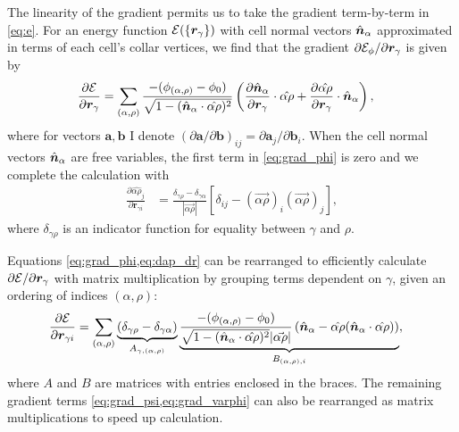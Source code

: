 The linearity of the gradient permits us to take the gradient term-by-term in \cref{eq:e}. For an energy function $\mathcal{E}(\{ \bm{r}_\gamma\})$ with cell normal vectors $\hat{\bm{n}}_\alpha$ approximated in terms of each cell's collar vertices, we find that the gradient $\partial \mathcal{E}_\phi / \partial \bm{r}_\gamma$ is given by 
\begin{align}
	\frac{\partial\mathcal{E}}{\partial\bm{r}_\gamma} &= \sum_{(\alpha,\rho)} \frac{-(\phi_{(\alpha,\rho)} - \phi_0)}{\sqrt{1-(\hat{\bm{n}}_\alpha \cdot \hat{\alpha\rho})^2}} \left(\frac{\partial \hat{\bm{n}}_\alpha}{\partial \bm{r}_\gamma} \cdot \hat{\alpha\rho} + \frac{\partial\hat{\alpha\rho}}{\partial\bm{r}_\gamma} \cdot \hat{\bm{n}}_\alpha \right), \label{eq:grad_phi}
\end{align}
\noindent where for vectors $\bm{a}, \bm{b}$ I denote $(\partial\bm{a}/\partial\bm{b})_{ij} = \partial\bm{a}_j /\partial\bm{b}_i$.
When the cell normal vectors $\hat{\bm{n}}_\alpha$ are free variables, the first term in \cref{eq:grad_phi} is zero and we complete the calculation with
\begin{align}
	\frac{\partial \hat{\alpha\rho}_j}{\partial\bm{r}_{\gamma i}} &= \frac{\delta_{\gamma\rho}-\delta_{\gamma\alpha}}{|\vec{\alpha\rho}|} \left[\delta_{ij} - (\vec{\alpha\rho})_i(\vec{\alpha\rho})_j \right], \label{eq:dap_dr}
\end{align}
where $\delta_{\gamma\rho}$ is an indicator function for equality between $\gamma$ and $\rho$. 

Equations \cref{eq:grad_phi,eq:dap_dr} can be rearranged to efficiently calculate $\partial\mathcal{E}/\partial\bm{r}_\gamma$ with matrix multiplication by grouping terms dependent on $\gamma$, given an ordering of indices $(\alpha,\rho)$:
\begin{align}
	\frac{\partial\mathcal{E}}{\partial\bm{r}_{\gamma i}} &= \sum_{(\alpha,\rho)} \underbrace{(\delta_{\gamma\rho} - \delta_{\gamma\alpha})}_{A_{\gamma,(\alpha,\rho)}} \underbrace{\frac{-(\phi_{(\alpha,\rho)} - \phi_0)}{\sqrt{1-(\hat{\bm{n}}_\alpha \cdot \hat{\alpha\rho})^2} |\vec{\alpha\rho}|} \left(\hat{\bm{n}}_\alpha - \hat{\alpha\rho} (\hat{\bm{n}}_\alpha \cdot \hat{\alpha\rho}) \right)}_{B_{(\alpha,\rho), i}}, \label{eq:grad_phi_mx}
\end{align}
where $A$ and $B$ are matrices with entries enclosed in the braces. 
The remaining gradient terms \cref{eq:grad_psi,eq:grad_varphi} can also be rearranged as matrix multiplications to speed up calculation.

